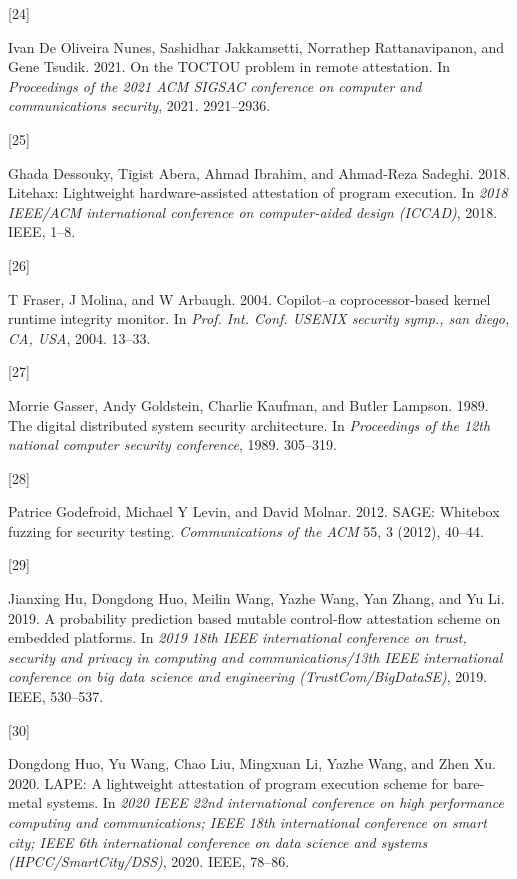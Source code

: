 \documentclass[a4paper, nobind]{templates/ociamthesis}
\newlength{\cslhangindent}
\newlength{\csllabelwidth}
\newenvironment{CSLReferences}[2] %
{\begin{list}{}{%
	\setlength{\itemindent}{0pt}
	\setlength{\leftmargin}{0pt}
	\setlength{\parsep}{0pt}
	\ifodd #1
	\setlength{\leftmargin}{\cslhangindent}
	\setlength{\itemindent}{-1\cslhangindent}
	\fi
	\setlength{\itemsep}{#2\baselineskip}}}
{\end{list}}
\newcommand{\CSLLeftMargin}[1]{\parbox[t]{\csllabelwidth}{\strut#1\strut}}
\newcommand{\CSLRightInline}[1]{\parbox[t]{\linewidth - \csllabelwidth}{\strut#1\strut}}
\begin{document}
\begin{CSLReferences}{0}{0}
\CSLLeftMargin{{[}24{]} }%
\CSLRightInline{Ivan De Oliveira Nunes, Sashidhar Jakkamsetti, Norrathep Rattanavipanon, and Gene Tsudik. 2021. On the TOCTOU problem in remote attestation. In \emph{Proceedings of the 2021 ACM SIGSAC conference on computer and communications security}, 2021. 2921--2936.}

\CSLLeftMargin{{[}25{]} }%
\CSLRightInline{Ghada Dessouky, Tigist Abera, Ahmad Ibrahim, and Ahmad-Reza Sadeghi. 2018. Litehax: Lightweight hardware-assisted attestation of program execution. In \emph{2018 IEEE/ACM international conference on computer-aided design (ICCAD)}, 2018. IEEE, 1--8.}

\CSLLeftMargin{{[}26{]} }%
\CSLRightInline{T Fraser, J Molina, and W Arbaugh. 2004. Copilot--a coprocessor-based kernel runtime integrity monitor. In \emph{Prof. Int. Conf. USENIX security symp., san diego, CA, USA}, 2004. 13--33.}

\CSLLeftMargin{{[}27{]} }%
\CSLRightInline{Morrie Gasser, Andy Goldstein, Charlie Kaufman, and Butler Lampson. 1989. The digital distributed system security architecture. In \emph{Proceedings of the 12th national computer security conference}, 1989. 305--319.}

\CSLLeftMargin{{[}28{]} }%
\CSLRightInline{Patrice Godefroid, Michael Y Levin, and David Molnar. 2012. SAGE: Whitebox fuzzing for security testing. \emph{Communications of the ACM} 55, 3 (2012), 40--44.}

\CSLLeftMargin{{[}29{]} }%
\CSLRightInline{Jianxing Hu, Dongdong Huo, Meilin Wang, Yazhe Wang, Yan Zhang, and Yu Li. 2019. A probability prediction based mutable control-flow attestation scheme on embedded platforms. In \emph{2019 18th IEEE international conference on trust, security and privacy in computing and communications/13th IEEE international conference on big data science and engineering (TrustCom/BigDataSE)}, 2019. IEEE, 530--537.}

\CSLLeftMargin{{[}30{]} }%
\CSLRightInline{Dongdong Huo, Yu Wang, Chao Liu, Mingxuan Li, Yazhe Wang, and Zhen Xu. 2020. LAPE: A lightweight attestation of program execution scheme for bare-metal systems. In \emph{2020 IEEE 22nd international conference on high performance computing and communications; IEEE 18th international conference on smart city; IEEE 6th international conference on data science and systems (HPCC/SmartCity/DSS)}, 2020. IEEE, 78--86.}


\end{CSLReferences}
\end{document}
